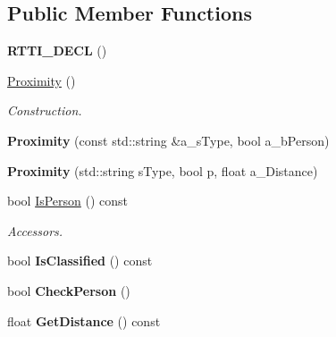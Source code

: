 \subsection*{Public Member Functions}
\begin{DoxyCompactItemize}
\item 
\mbox{\label{class_proximity_a663269433b7f33c5e14e22306dbbc01a}} 
{\bfseries R\+T\+T\+I\+\_\+\+D\+E\+CL} ()
\item 
\mbox{\label{class_proximity_a15dc826d5afc130edad3eb1ad9869ccc}} 
\hyperlink{class_proximity_a15dc826d5afc130edad3eb1ad9869ccc}{Proximity} ()
\begin{DoxyCompactList}\small\item\em Construction. \end{DoxyCompactList}\item 
\mbox{\label{class_proximity_a0c40207c24ee0b4f014348f49ca81f8a}} 
{\bfseries Proximity} (const std\+::string \&a\+\_\+s\+Type, bool a\+\_\+b\+Person)
\item 
\mbox{\label{class_proximity_aa503a7d5d0d688f5cc08e6dff4547e64}} 
{\bfseries Proximity} (std\+::string s\+Type, bool p, float a\+\_\+\+Distance)
\item 
\mbox{\label{class_proximity_a44482bf526f0d7e7e9d921a77dd07a88}} 
bool \hyperlink{class_proximity_a44482bf526f0d7e7e9d921a77dd07a88}{Is\+Person} () const
\begin{DoxyCompactList}\small\item\em Accessors. \end{DoxyCompactList}\item 
\mbox{\label{class_proximity_a4712681b706a0d9d4efb6719c2653913}} 
bool {\bfseries Is\+Classified} () const
\item 
\mbox{\label{class_proximity_aacb22e68c8be9a29846248296e236734}} 
bool {\bfseries Check\+Person} ()
\item 
\mbox{\label{class_proximity_a39bd0f3d99982a91d1cab040bd2e44f2}} 
float {\bfseries Get\+Distance} () const
\item 
\mbox{\label{class_proximity_ac5b9c6f3c475cc9f3685f1014c03947b}} 

\end{DoxyCompactItemize}
